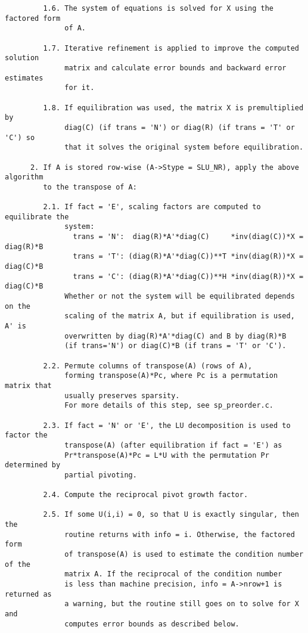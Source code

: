 \begin{verbatim}
         1.6. The system of equations is solved for X using the factored form
              of A.
   
         1.7. Iterative refinement is applied to improve the computed solution
              matrix and calculate error bounds and backward error estimates
              for it.
   
         1.8. If equilibration was used, the matrix X is premultiplied by
              diag(C) (if trans = 'N') or diag(R) (if trans = 'T' or 'C') so
              that it solves the original system before equilibration.
   
      2. If A is stored row-wise (A->Stype = SLU_NR), apply the above algorithm
         to the transpose of A:
   
         2.1. If fact = 'E', scaling factors are computed to equilibrate the
              system:
                trans = 'N':  diag(R)*A'*diag(C)     *inv(diag(C))*X = diag(R)*B
                trans = 'T': (diag(R)*A'*diag(C))**T *inv(diag(R))*X = diag(C)*B
                trans = 'C': (diag(R)*A'*diag(C))**H *inv(diag(R))*X = diag(C)*B
              Whether or not the system will be equilibrated depends on the
              scaling of the matrix A, but if equilibration is used, A' is
              overwritten by diag(R)*A'*diag(C) and B by diag(R)*B 
              (if trans='N') or diag(C)*B (if trans = 'T' or 'C').
   
         2.2. Permute columns of transpose(A) (rows of A), 
              forming transpose(A)*Pc, where Pc is a permutation matrix that 
              usually preserves sparsity.
              For more details of this step, see sp_preorder.c.
   
         2.3. If fact = 'N' or 'E', the LU decomposition is used to factor the
              transpose(A) (after equilibration if fact = 'E') as 
              Pr*transpose(A)*Pc = L*U with the permutation Pr determined by
              partial pivoting.
   
         2.4. Compute the reciprocal pivot growth factor.
   
         2.5. If some U(i,i) = 0, so that U is exactly singular, then the
              routine returns with info = i. Otherwise, the factored form 
              of transpose(A) is used to estimate the condition number of the
              matrix A. If the reciprocal of the condition number
              is less than machine precision, info = A->nrow+1 is returned as
              a warning, but the routine still goes on to solve for X and
              computes error bounds as described below.
   

\end{verbatim}
